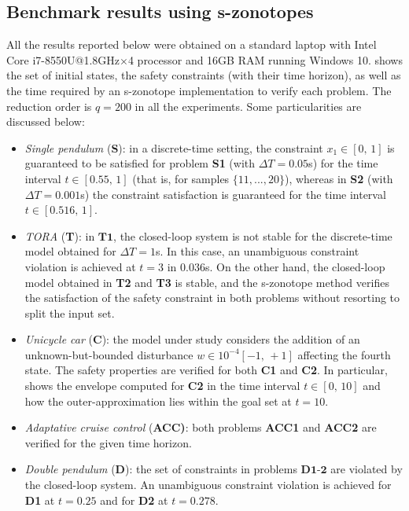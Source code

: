 \documentclass[journal]{IEEEtran}
\begin{document}

\subsection{Benchmark results using s-zonotopes}

All the results reported below were obtained on a standard laptop with  Intel Core i7-8550U@1.8GHz$\times$4 processor and 16GB RAM running Windows 10.  shows the set of initial states, the safety constraints (with their time horizon), as well as the time required by an s-zonotope implementation to verify each problem. The reduction order is $q = 200$ in all the experiments. Some particularities are discussed below:
\begin{itemize}
    \item \textit{Single pendulum} (\textbf{S}): in a discrete-time setting, the constraint $x_1 \in [0, \, 1]$ is guaranteed to be satisfied for  problem \textbf{S1} (with $\Delta T = 0.05$s) for the time interval $t \in [0.55, \, 1]$  (that is, for samples $\{11,...,20\}$), whereas in \textbf{S2} (with $\Delta T = 0.001$s) the constraint satisfaction is guaranteed for the time interval $t \in [0.516, \, 1]$. 
    \item \textit{TORA} (\textbf{T}): in $\textbf{T1}$, the closed-loop system is not stable for the discrete-time model obtained for $\Delta T = 1$s. In this case, an unambiguous constraint violation is achieved at  $t = 3$ in $0.036$s. On the other hand, the closed-loop model obtained in \textbf{T2} and \textbf{T3} is stable, and the s-zonotope method verifies the satisfaction of the safety constraint in both problems without resorting to split the input set.  
    \item \textit{Unicycle car} (\textbf{C}): the model under study considers the addition of an unknown-but-bounded disturbance $w \in 10^{-4}[-1,\, +1]$ affecting the fourth state. The safety properties are verified for both \textbf{C1} and \textbf{C2}. In particular,  shows the envelope computed for \textbf{C2} in the time interval $t \in [0, \, 10]$ and how the outer-approximation lies within the goal set at $t=10$. 
    \item \textit{Adaptative cruise control} (\textbf{ACC)}: both problems \textbf{ACC1} and \textbf{ACC2} are verified for the given time horizon.
    \item \textit{Double pendulum} (\textbf{D}): the set of constraints in problems $\textbf{D1-2}$ are violated by the closed-loop system. An unambiguous constraint violation is achieved for \textbf{D1} at $t = 0.25$ and for \textbf{D2} at $t=0.278$. 

\end{itemize}
\end{document}
